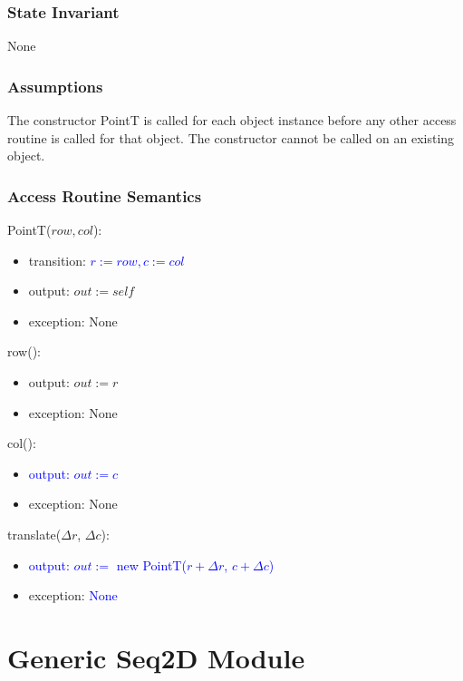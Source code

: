\documentclass[12pt]{article}
\begin{document}
\subsubsection* {State Invariant}

None

\subsubsection* {Assumptions}

The constructor PointT is called for each object instance before any other
access routine is called for that object.  The constructor cannot be called on
an existing object.

\subsubsection* {Access Routine Semantics}

PointT($row, col$):
\begin{itemize}
\item transition: \textcolor{blue}{$r := row, c := col$}

\item output: $out := \mathit{self}$
\item exception: None
\end{itemize}

\noindent row():
\begin{itemize}
\item output: $out := r$
\item exception: None
\end{itemize}

\noindent col():
\begin{itemize}
\item \textcolor{blue}{output: $out := c$}
\item exception: None
\end{itemize}

\noindent translate($\Delta r$, $\Delta c$):
\begin{itemize}
\item \textcolor{blue}{output: $out := $ new PointT($r + \Delta r$, $c + \Delta c$)}
\item exception: \textcolor{blue}{None}
\end{itemize}

\newpage

\section* {Generic Seq2D Module}
\end{document}
